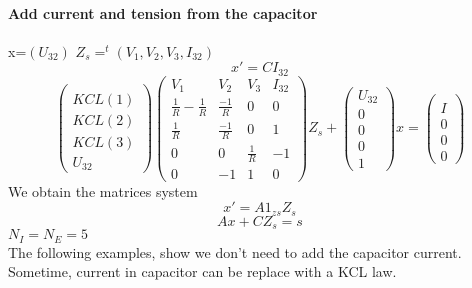 \paragraph{Add current and tension from the capacitor}
x=$(U_{32})$
$Z_{s}=^{t}(V_{1},V_{2},V_{3},I_{32})$\\
\[x'=CI_{32}\]
\[\left(\begin{array}{c}
  \\
  KCL(1)\\
  KCL(2)\\
  KCL(3)\\
  U_{32}
  \end{array}\right)
\left(\begin{array}{cccc}
  V_{1}&V_{2}&V_{3}&I_{32}\\
  \hline
  \frac{1}{R}-\frac{1}{R}&  \frac{-1}{R}&0&0\\
  \frac{1}{R}&  \frac{-1}{R}&0&1\\
  0&0&\frac{1}{R}&-1\\
  0&-1&1&0
\end{array}\right)Z_{s}+
\left(\begin{array}{c}
  U_{32}\\
  \hline
  0\\
  0\\
  0\\
  1
  \end{array}\right)x
=
\left(\begin{array}{c}
  \\
  I\\
  0\\
  0\\
  0
  \end{array}\right)
\]
We obtain the matrices system\\
\[x'=A1_{zs}Z_{s}\]
\[Ax+CZ_{s}=s\]
$N_{I}=N_{E}=5$\\
The following examples, show we don't need to add the capacitor current. Sometime, current in
capacitor can be replace with a KCL law.\\

